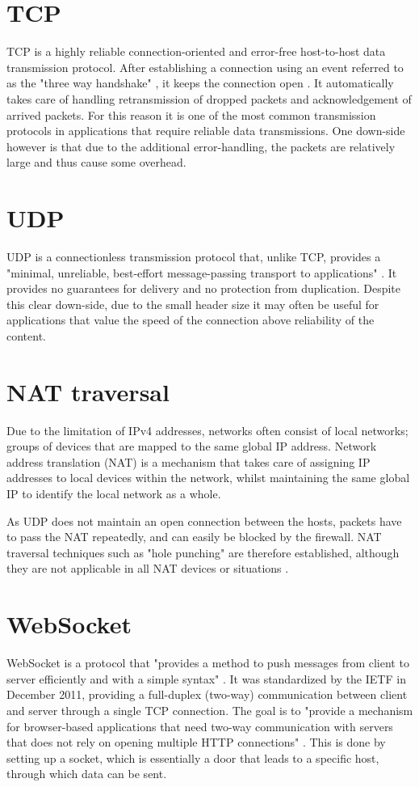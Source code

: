 \documentclass[bsc,frontabs,twoside,singlespacing,parskip,deptreport]{infthesis}     %
\begin{document}
\section{TCP}
TCP is a highly reliable connection-oriented and error-free host-to-host data transmission protocol. After establishing a connection using an event referred to as the "three way handshake" \cite{handshake}, it keeps the connection open \cite{tcp_open_connection}. It automatically takes care of handling retransmission of dropped packets and acknowledgement of arrived packets. For this reason it is one of the most common transmission protocols in applications that require reliable data transmissions. One down-side however is that due to the additional error-handling, the packets are relatively large and thus cause some overhead.

\section{UDP}
UDP is a connectionless transmission protocol that, unlike TCP, provides a "minimal, unreliable, best-effort message-passing transport to applications" \cite{udp_connectionless}. It provides no guarantees for delivery and no protection from duplication. Despite this clear down-side, due to the small header size it may often be useful for applications that value the speed of the connection above reliability of the content.
\section{NAT traversal}
Due to the limitation of IPv4 addresses, networks often consist of local networks; groups of devices that are mapped to the same global IP address. Network address translation (NAT) is a mechanism that takes care of assigning IP addresses to local devices within the network, whilst maintaining the same global IP to identify the local network as a whole.

As UDP does not maintain an open connection between the hosts, packets have to pass the NAT repeatedly, and can easily be blocked by the firewall. 
NAT traversal techniques such as "hole punching" are therefore established, although they are not applicable in all NAT devices or situations \cite{udp_holepunching}.

\section{WebSocket}
WebSocket is a protocol that "provides a method to push messages from client to server efficiently and with a simple syntax" \cite{WebSocket}. It was standardized by the IETF in December 2011, providing a full-duplex (two-way) communication between client and server through a single TCP connection. The goal is to "provide a mechanism for browser-based applications that need two-way communication with servers that does not rely on opening multiple HTTP connections" \cite{websocket_communication}. This is done by setting up a socket, which is essentially a door that leads to a specific host, through which data can be sent.
\end{document}
